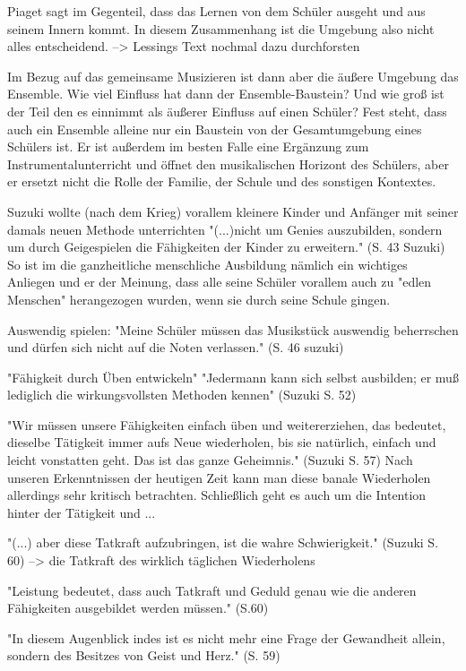 Piaget sagt im Gegenteil, dass das Lernen von dem Schüler ausgeht und aus seinem
Innern kommt. In diesem Zusammenhang ist die Umgebung also nicht alles entscheidend.
--> Lessings Text nochmal dazu durchforsten

Im Bezug auf das gemeinsame Musizieren ist dann aber die äußere Umgebung das
Ensemble. Wie viel Einfluss hat dann der Ensemble-Baustein? Und wie groß ist der
Teil den es einnimmt als äußerer Einfluss auf einen Schüler? Fest steht, dass
auch ein Ensemble alleine nur ein Baustein von der Gesamtumgebung eines Schülers
ist. Er ist außerdem im besten Falle eine Ergänzung zum Instrumentalunterricht
und öffnet den musikalischen Horizont des Schülers, aber er ersetzt nicht die
Rolle der Familie, der Schule und des sonstigen Kontextes. 

Suzuki wollte (nach dem Krieg) vorallem kleinere Kinder und Anfänger mit seiner
damals neuen Methode unterrichten "(...)nicht um Genies auszubilden, sondern um
durch Geigespielen die Fähigkeiten der Kinder zu erweitern." (S. 43 Suzuki) So
ist im die ganzheitliche menschliche Ausbildung nämlich ein wichtiges Anliegen
und er der Meinung, dass alle seine Schüler vorallem auch zu "edlen Menschen"
herangezogen wurden, wenn sie durch seine Schule gingen. 

Auswendig spielen: "Meine Schüler müssen das Musikstück auswendig beherrschen
und dürfen sich nicht auf die Noten verlassen." (S. 46 suzuki)

"Fähigkeit durch Üben entwickeln" "Jedermann kann sich selbst ausbilden; er muß
lediglich die wirkungsvollsten Methoden kennen" (Suzuki S. 52)

"Wir müssen unsere Fähigkeiten einfach üben und weitererziehen, das bedeutet,
dieselbe Tätigkeit immer aufs Neue wiederholen, bis sie natürlich, einfach und
leicht vonstatten geht. Das ist das ganze Geheimnis." (Suzuki S. 57)
Nach unseren Erkenntnissen der heutigen Zeit kann man diese banale Wiederholen
allerdings sehr kritisch betrachten. Schließlich geht es auch um die Intention
hinter der Tätigkeit und ...

"(...) aber diese Tatkraft aufzubringen, ist die wahre Schwierigkeit." (Suzuki
S. 60) --> die Tatkraft des wirklich täglichen Wiederholens

"Leistung bedeutet, dass auch Tatkraft und Geduld genau wie die anderen
Fähigkeiten ausgebildet werden müssen." (S.60)

"In diesem Augenblick indes ist es nicht mehr eine Frage der Gewandheit allein,
sondern des Besitzes von Geist und Herz." (S. 59)

